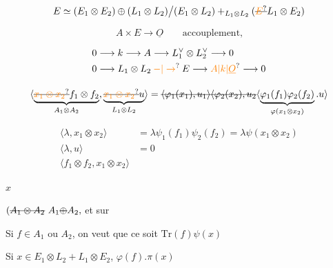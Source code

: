 
\[ E\simeq(E_1\otimes E_2)\oplus(L_1\otimes L_2)\big/(E_1\otimes L_2)+_{L_1\otimes L_2}(\deleted{\unsure{E}}L_1\otimes E_2) \]

\[ A\times E\longrightarrow\underline O\qquad\text{accouplement,} \]

\[
\begin{aligned}
0&\longrightarrow k\longrightarrow A\longrightarrow L_1^\vee\otimes L_2^\vee\longrightarrow0\\
0&\longrightarrow L_1\otimes L_2\mathbin{\unsure{-|\to}}E\longrightarrow\unsure{A|k|\underline O}\longrightarrow0
\end{aligned}
\]

\[
\langle\underset{A_1\otimes A_2}{\overset{}{\underbrace{\deleted{\unsure{x_1\otimes x_2}}f_1\otimes f_2}}},
\underset{L_1\otimes L_2}{\underbrace{\deleted{\unsure{x_1\otimes x_2}}u}}\rangle
=\deleted{\langle\varphi_1(x_1),u_1\rangle\langle\varphi_2(x_2),u_2}
\inserted{\underbrace{\varphi_1(f_1)\varphi_2(f_2)}_{\varphi(x_1\otimes x_2)}.u}
\]

\[
\begin{aligned}
\langle\lambda,x_1\otimes x_2\rangle&=\lambda\psi_1(f_1)\psi_2(f_2)=\lambda\psi(x_1\otimes x_2)\\
\langle\lambda,u\rangle&=0\\
\langle f_1\otimes f_2,x_1\otimes x_2\rangle&
\end{aligned}
\]

\quad $x$\quad {}

\qquad {}

$(\deleted{A_1\otimes A_2}\ A_1\deleted{\oplus}A_2,$ et sur

Si $f\in A_1$ ou $A_2$, on veut que ce soit $\mathrm{Tr}(f)\psi(x)$

Si $x\in E_1\otimes L_2+L_1\otimes E_2$,  $\varphi(f).\pi(x)$

